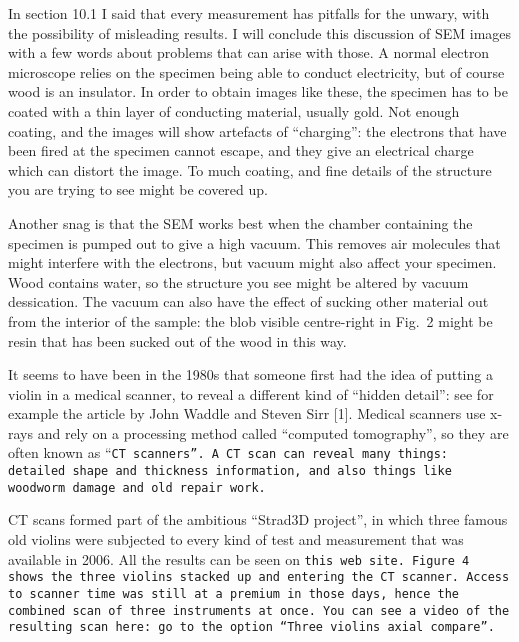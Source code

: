   In section 10.1 I said that every measurement has pitfalls for the unwary, 
  with the possibility of misleading results. I will conclude this discussion 
  of SEM images with a few words about problems that can arise with those. A 
  normal electron microscope relies on the specimen being able to conduct 
  electricity, but of course wood is an insulator. In order to obtain images 
  like these, the specimen has to be coated with a thin layer of conducting 
  material, usually gold. Not enough coating, and the images will show 
  artefacts of ``charging'': the electrons that have been fired at the specimen 
  cannot escape, and they give an electrical charge which can distort the 
  image. To much coating, and fine details of the structure you are trying to 
  see might be covered up. 

  Another snag is that the SEM works best when the chamber containing the 
  specimen is pumped out to give a high vacuum. This removes air molecules that 
  might interfere with the electrons, but vacuum might also affect your 
  specimen. Wood contains water, so the structure you see might be altered by 
  vacuum dessication. The vacuum can also have the effect of sucking other 
  material out from the interior of the sample: the blob visible centre-right 
  in Fig.\ 2 might be resin that has been sucked out of the wood in this way. 

  It seems to have been in the 1980s that someone first had the idea of putting 
  a violin in a medical scanner, to reveal a different kind of “hidden detail”: 
  see for example the article by John Waddle and Steven Sirr [1]. Medical 
  scanners use x-rays and rely on a processing method called “computed 
  tomography”, so they are often known as “\tt{}CT scanners\rm{}”. A CT scan 
  can reveal many things: detailed shape and thickness information, and also 
  things like woodworm damage and old repair work. 


  CT scans formed part of the ambitious “Strad3D project”, in which three 
  famous old violins were subjected to every kind of test and measurement that 
  was available in 2006. All the results can be seen on \tt{}this 
  web site\rm{}. Figure 4 shows the three violins stacked up and entering the 
  CT scanner. Access to scanner time was still at a premium in those days, 
  hence the combined scan of three instruments at once. You can see a video of 
  the resulting scan \tt{}here\rm{}: go to the option “Three violins axial 
  compare”. 

